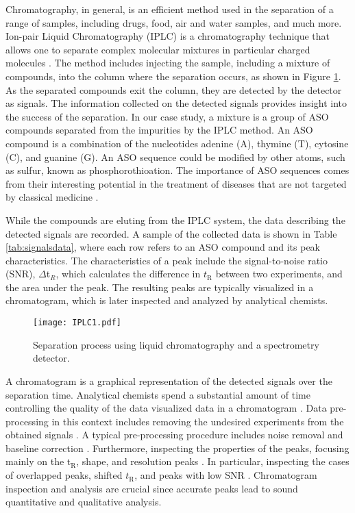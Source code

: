 Chromatography, in general, is an efficient method used in the separation of a range of samples, including drugs, food, air and water samples, and much more. Ion-pair Liquid Chromatography (IPLC) is a chromatography technique that allows one to separate complex molecular mixtures in particular charged molecules \cite{ENMARK2022}. The method includes injecting the sample, including a mixture of compounds, into the column where the separation occurs, as shown in Figure \ref{fig:IPLC}. As the separated compounds exit the column, they are detected by the detector as signals. The information collected on the detected signals provides insight into the success of the separation. In our case study, a mixture is a group of ASO compounds separated from the impurities by the IPLC method. An ASO compound is a combination of the nucleotides adenine (A), thymine (T), cytosine (C), and guanine (G). An ASO sequence could be modified by other atoms, such as sulfur, known as phosphorothioation. The importance of ASO sequences comes from their interesting potential in the treatment of diseases that are not targeted by classical medicine \cite{Thakur2022, FORNSTEDT2023}. 

While the compounds are eluting from the IPLC system, the data describing the detected signals are recorded. A sample of the collected data is shown in Table \ref{tab:signalsdata}, where each row refers to an ASO compound and its peak characteristics. The characteristics of a peak include the signal-to-noise ratio (SNR), $\Delta$t$_R$, which calculates the difference in $t_\mathrm{R}$ between two experiments, and the area under the peak. The resulting peaks are typically visualized in a chromatogram, which is later inspected and analyzed by analytical chemists.

\begin{figure}
  \centering
    \texttt{[image: IPLC1.pdf]}
    \caption{Separation process using liquid chromatography and a spectrometry detector. }\label{fig:IPLC}
\end{figure}

A chromatogram is a graphical representation of the detected signals over the separation time. Analytical chemists spend a substantial amount of time controlling the quality of the data visualized data in a chromatogram \cite{Felinger1998}. Data pre-processing in this context includes removing the undesired experiments from the obtained signals \cite{YANG2019}. A typical pre-processing procedure includes noise removal and baseline correction \cite{YANG2019}. Furthermore, inspecting the properties of the peaks, focusing mainly on the t$_\mathrm{R}$, shape, and resolution peaks \cite{Felinger1998}. In particular, inspecting the cases of overlapped peaks, shifted $t_\mathrm{R}$, and peaks with low SNR \cite{JOHNSEN2017}. Chromatogram inspection and analysis are crucial since accurate peaks lead to sound quantitative and qualitative analysis. 

